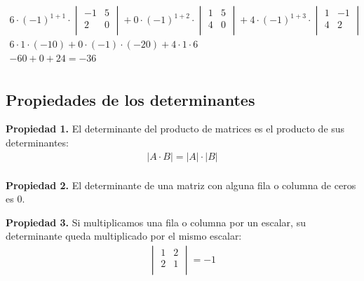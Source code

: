 \documentclass[12pt]{article}
\begin{document}
\begin{align*}
  6 \cdot (-1)^{1 + 1} \cdot \begin{vmatrix}
                               -1 & 5 \\
                               2  & 0 \\
                             \end{vmatrix}
  +
  0 \cdot (-1)^{1 + 2} \cdot \begin{vmatrix}
                               1 & 5 \\
                               4 & 0 \\
                             \end{vmatrix}
  +
  4 \cdot (-1)^{1 + 3} \cdot \begin{vmatrix}
                               1 & -1 \\
                               4 & 2  \\
                             \end{vmatrix}                            \\
  6 \cdot 1 \cdot (-10) + 0 \cdot (-1) \cdot (-20) + 4 \cdot 1 \cdot 6 \\
  -60 + 0 + 24 = -36                                                   \\
\end{align*}

\subsection{Propiedades de los determinantes}

\textbf{Propiedad 1.} 
El determinante del producto de matrices es el producto de sus determinantes:
\begin{align*}
  |A \cdot B| = |A| \cdot |B| \\
\end{align*}

\textbf{Propiedad 2.}
El determinante de una matriz con alguna fila o columna de ceros es 0.

\textbf{Propiedad 3.}
Si multiplicamos una fila o columna por un escalar,
su determinante queda multiplicado por el mismo escalar:
\begin{align*}
  \begin{vmatrix}
    1 & 2\\
    2 & 1\\
  \end{vmatrix} = -1\\
\end{align*}
\end{document}
